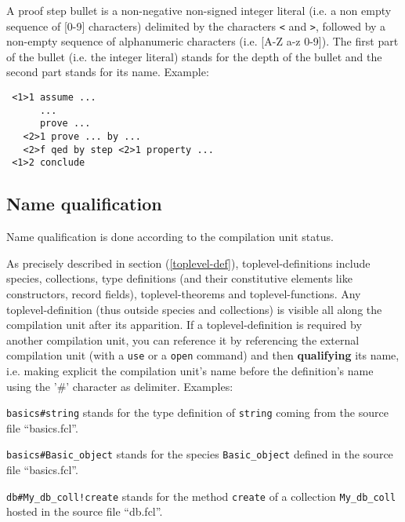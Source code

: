 A proof step bullet is a non-negative non-signed integer literal
(i.e. a non empty sequence of [0-9] characters) delimited by the
characters {\tt <} and {\tt >}, followed by a non-empty sequence of
alphanumeric characters (i.e. [A-Z a-z 0-9]).
The first part of the bullet (i.e. the integer literal) stands for the
depth of the bullet and the second part stands for its name. Example:

{\scriptsize
\begin{lstlisting}
 <1>1 assume ...
      ...
      prove ...
   <2>1 prove ... by ...
   <2>f qed by step <2>1 property ...
 <1>2 conclude
\end{lstlisting}
}

\subsection{Name qualification}
\label{qualified-name}
 

Name qualification is done according to the
compilation unit status.

As precisely described in section (\ref{toplevel-def}),
toplevel-definitions include species, collections, type definitions
(and their constitutive elements like constructors, record fields),
toplevel-theorems and toplevel-functions.  Any toplevel-definition (thus
outside species and collections) is visible all along the compilation unit
after its apparition.
If a toplevel-definition is required by another compilation unit, you can
reference it by referencing the external compilation unit
(with a {\tt use} or a {\tt open} command) and then
{\bf qualifying} its name, i.e. making explicit the
compilation unit's name before the definition's name using the '\#'
character as delimiter. Examples:

\begin{compact-itemize}
  \item {\tt basics\#string} stands for the type definition of
    {\tt string} coming from the source file ``basics.fcl''.
  \item {\tt  basics\#Basic\_object} stands for the species
    {\tt Basic\_object} defined in the source file ``basics.fcl''.
  \item {\tt db\#My\_db\_coll!create} stands for the method
    {\tt create} of a collection {\tt My\_db\_coll} hosted in the
    source file ``db.fcl''.
\end{compact-itemize}

